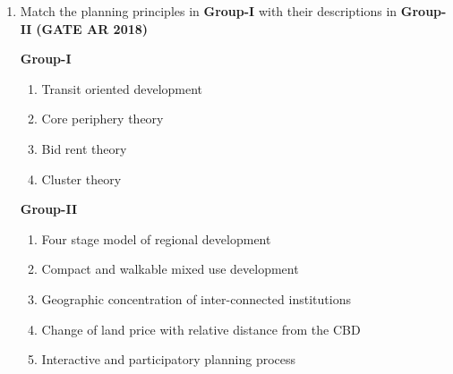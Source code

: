 \documentclass[journal,15pt,onecolumn]{IEEEtran}
\theoremstyle{remark}
\begin{document}
\begin{enumerate}
\vspace{0.3cm}

\begin{multicols}{2}
\begin{enumerate}
    \item P-5, Q-3, R-1, S-4
    \item P-3, Q-5, R-1, S-4
    \item P-2, Q-3, R-1, S-5
    \item P-5, Q-2, R-4, S-1
\end{enumerate}
\end{multicols}


 

\item 
Match the planning principles in \textbf{Group-I} with their descriptions in \textbf{Group-II}\hfill \textbf{ (GATE AR 2018)}

 \begin{multicols}{2}
     
 
\hspace{1cm} \textbf{Group-I}
\begin{enumerate}
    \item     \hspace{0.2cm} Transit oriented development
    \item      \hspace{0.2cm} Core periphery theory
    \item      \hspace{0.2cm} Bid rent theory
    \item      \hspace{0.2cm} Cluster theory
\end{enumerate}


\textbf{Group-II}
\begin{enumerate}
    \item Four stage model of regional development
    \item Compact and walkable mixed use development
    \item Geographic concentration of inter-connected institutions
    \item Change of land price with relative distance from the CBD
    \item Interactive and participatory planning process
\end{enumerate}
\end{multicols}

\vspace{0.5cm}
\begin{multicols}{2}
    


\end{multicols}
\end{enumerate}
\end{document}
